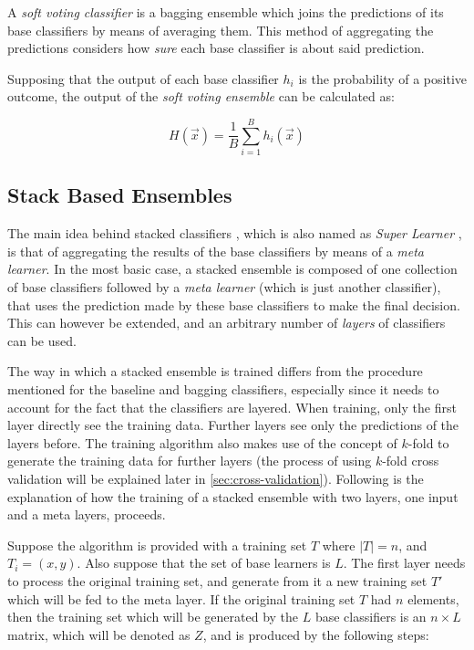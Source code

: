 \documentclass[epsfig,a4paper,11pt,titlepage,twoside,openany]{book}
\begin{document}
A \textit{soft voting classifier} is a bagging ensemble which joins the predictions of its base classifiers by means of averaging them. This method of aggregating the predictions considers how \textit{sure} each base classifier is about said prediction. 

Supposing that the output of each base classifier $h_i$ is the probability of a positive outcome, the output of the \textit{soft voting ensemble} can be calculated as:

\begin{equation*}
    H(\vec{x}) = \frac{1}{B} \sum_{i=1}^B h_i (\vec{x}) 
\end{equation*}


\subsection{Stack Based Ensembles}
\label{sec:stacked-ensembles}

The main idea behind stacked classifiers \cite{wolpert1992stacked,Breiman1996_stack}, which is also named as \textit{Super Learner} \cite{van2007super}, is that of aggregating the results of the base classifiers by means of a \textit{meta learner}. In the most basic case, a stacked ensemble is composed of one collection of base classifiers followed by a \textit{meta learner} (which is just another classifier), that uses the prediction made by these base classifiers to make the final decision. This can however be extended, and an arbitrary number of \textit{layers} of classifiers can be used.

The way in which a stacked ensemble is trained differs from the procedure mentioned for the baseline and bagging classifiers, especially since it needs to account for the fact that the classifiers are layered. When training, only the first layer directly see the training data. Further layers see only the predictions of the layers before. The training algorithm also makes use of the concept of $k$-fold to generate the training data for further layers (the process of using $k$-fold cross validation will be explained later in \autoref{sec:cross-validation}). Following is the explanation of how the training of a stacked ensemble with two layers, one input and a meta layers, proceeds.

Suppose the algorithm is provided with a training set $T$ where $|T| = n$, and $T_i = (x, y)$. Also suppose that the set of base learners is $L$. The first layer needs to process the original training set, and generate from it a new training set $T'$ which will be fed to the meta layer. If the original training set $T$ had $n$ elements, then the training set which will be generated by the $L$ base classifiers is an $n \times L$ matrix, which will be denoted as $Z$, and is produced by the following steps:
\end{document}
